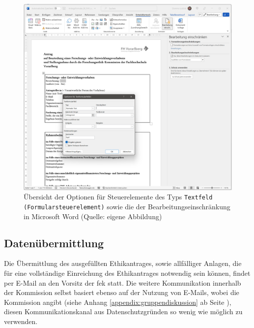 \documentclass[a4paper,12pt,twoside]{scrreprt}
\begin{document}
\begin{figure}[ht]
    \centering
    \includegraphics[width=\linewidth]{thesis/images/Luidold_Word-Vorlage-FHV-Textformularfeld.png}
    \caption[Übersicht der Optionen für Steuerelemente des Typs \texttt{Textfeld (Formularsteuerelement)} sowie die der Bearbeitungseinschränkung in Microsoft Word]{Übersicht der Optionen für Steuerelemente des Typs \texttt{Textfeld (Formularsteuerelement)} sowie die der Bearbeitungseinschränkung in Microsoft Word (Quelle: eigene Abbildung)}
    \label{fig:optionen-textformularfeld-bearbeitungsmöglichkeiten}
\end{figure}

\subsection{Datenübermittlung}
\label{sub-sec:datenübermittlung}

Die Übermittlung des ausgefüllten Ethikantrages, sowie allfälliger Anlagen, die für eine vollständige Einreichung des Ethikantrages notwendig sein können, findet per E-Mail an den Vorsitz der \ac{fek} statt. \cite{fachhochschule_vorarlberg_gmbh_forschungsethik-kommission_2021} Die weitere Kommunikation innerhalb der Kommission selbst basiert ebenso auf der Nutzung von E-Mails, wobei die Kommission angibt (siehe Anhang \ref{appendix:gruppendiskussion} ab Seite \pageref{appendix:gruppendiskussion}), diesen Kommunikationskanal aus Datenschutzgründen so wenig wie möglich zu verwenden.
\end{document}
